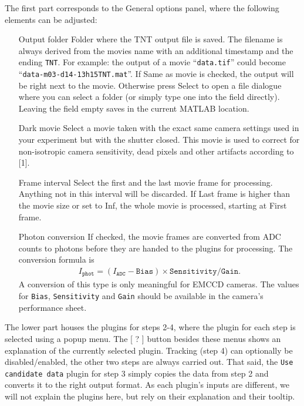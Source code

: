 \documentclass[11pt,onside]{report}
\numberwithin{equation}{chapter}
\begin{document}
The first part corresponds to the \textsf{General options} panel, where the following elements can be adjusted:
\begin{itemize}[leftmargin=3.5cm]
\item[\textsf{Output folder}] Folder where the TNT output file is saved. The filename is always derived from the movies name with an additional timestamp and the ending \texttt{\textunderscore TNT}. For example: the output of a movie ``\texttt{data.tif}'' could become ``\texttt{data-m03-d14-13h15\textunderscore TNT.mat}''. If \textsf{Same as movie} is checked, the output will be right next to the movie. Otherwise press \textsf{Select} to open a file dialogue where you can select a folder (or simply type one into the field directly). Leaving the field empty saves in the current MATLAB location.
\item[\textsf{Dark movie}] Select a movie taken with the exact same camera settings used in your experiment but with the shutter closed. This movie is used to correct for non-isotropic camera sensitivity, dead pixels and other artifacts according to [1].
\item[\textsf{Frame interval}] Select the first and the last movie frame for processing. Anything not in this interval will be discarded. If \textsf{Last frame} is higher than the movie size or set to \textsf{Inf}, the whole movie is processed, starting at \textsf{First frame}.
\item[\textsf{Photon conversion}] If checked, the movie frames are converted from ADC counts to photons before they are handed to the plugins for processing. The conversion formula is
\begin{align}
I_{\texttt{phot}} = (I_{\texttt{ADC}}-\texttt{Bias})\times\texttt{Sensitivity}/\texttt{Gain}.
\end{align}
A conversion of this type is only meaningful for EMCCD cameras. The values for \texttt{Bias}, \texttt{Sensitivity} and \texttt{Gain} should be available in the camera's performance sheet.
\end{itemize}

The lower part houses the plugins for steps 2-4, where the plugin for each step is selected using a popup menu. The [ \textsf{?} ] button besides these menus shows an explanation of the currently selected plugin. Tracking (step 4) can optionally be disabled/enabled, the other two steps are always carried out. That said, the \texttt{Use candidate data} plugin for step 3 simply copies the data from step 2 and converts it to the right output format. As each plugin's inputs are different, we will not explain the plugins here, but rely on their explanation and their tooltip.\\
\end{document}
